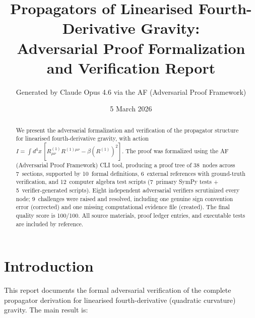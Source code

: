 \documentclass[11pt,a4paper]{article}
\title{\bfseries Propagators of Linearised Fourth-Derivative Gravity:\\
\large Adversarial Proof Formalization and Verification Report}
\author{Generated by Claude Opus 4.6 via the AF (Adversarial Proof Framework)}
\date{5 March 2026}
\begin{document}
\maketitle

\begin{abstract}
We present the adversarial formalization and verification of the propagator
structure for linearised fourth-derivative gravity, with action
$I = \int d^4x\,[R^{(1)}_{\mu\nu}R^{(1)\mu\nu} - \beta(R^{(1)})^2]$.
The proof was formalized using the AF (Adversarial Proof Framework) CLI tool,
producing a proof tree of 38~nodes across 7~sections, supported by
10~formal definitions, 6~external references with ground-truth verification,
and 12~computer algebra test scripts (7~primary SymPy tests + 5~verifier-generated
scripts). Eight independent adversarial verifiers scrutinized every node;
9~challenges were raised and resolved, including one genuine sign convention
error (corrected) and one missing computational evidence file (created).
The final quality score is 100/100. All source materials, proof ledger entries,
and executable tests are included by reference.
\end{abstract}

\tableofcontents
\newpage

\section{Introduction}
\label{sec:intro}

This report documents the formal adversarial verification of the complete
propagator derivation for linearised fourth-derivative (quadratic curvature)
gravity. The main result is:
\end{document}
